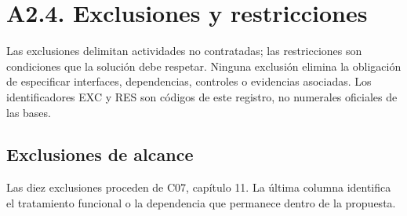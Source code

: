 \section*{A2.4. Exclusiones y restricciones}
Las exclusiones delimitan actividades no contratadas; las restricciones son condiciones que la solución debe respetar. Ninguna exclusión elimina la obligación de especificar interfaces, dependencias, controles o evidencias asociadas. Los identificadores EXC y RES son códigos de este registro, no numerales oficiales de las bases.

\subsection*{Exclusiones de alcance}
Las diez exclusiones proceden de C07, capítulo 11. La última columna identifica el tratamiento funcional o la dependencia que permanece dentro de la propuesta.

